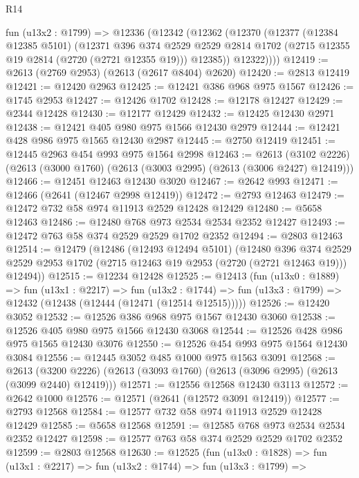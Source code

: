\begin{lexlean}{R14}
\begin{coremodule}
    fun (u13x2 : @1799) =>
    @12336
      (@12342
        (@12362
          (@12370
            (@12377
              (@12384 @12385 @5101)
              (@12371
                @396
                @374
                @2529
                @2529
                @2814
                @1702
                (@2715 @12355 @19 @2814 (@2720 (@2721 @12355 @19)))
                @12385))
            @12322))))
@12419 := @2613 (@2769 @2953) (@2613 (@2617 @8404) @2620)
@12420 := @2813 @12419
@12421 := @12420 @2963
@12425 := @12421 @386 @968 @975 @1567
@12426 := @1745 @2953
@12427 := @12426 @1702
@12428 := @12178 @12427
@12429 := @2344 @12428
@12430 := @12177 @12429
@12432 := @12425 @12430 @2971
@12438 := @12421 @405 @980 @975 @1566 @12430 @2979
@12444 := @12421 @428 @986 @975 @1565 @12430 @2987
@12445 := @2750 @12419
@12451 := @12445 @2963 @454 @993 @975 @1564 @2998
@12463 := @2613
    (@3102 @2226)
    (@2613 (@3000 @1760) (@2613 (@3003 @2995) (@2613 (@3006 @2427) @12419)))
@12466 := @12451 @12463 @12430 @3020
@12467 := @2642 @993
@12471 := @12466 (@2641 (@12467 @2998 @12419))
@12472 := @2793 @12463
@12479 := @12472 @732 @58 @974 @11913 @2529 @12428 @12429
@12480 := @5658 @12463
@12486 := @12480 @768 @973 @2534 @2534 @2352 @12427
@12493 := @12472 @763 @58 @374 @2529 @2529 @1702 @2352
@12494 := @2803 @12463
@12514 := @12479
    (@12486
      (@12493 @12494 @5101)
      (@12480
        @396
        @374
        @2529
        @2529
        @2953
        @1702
        (@2715 @12463 @19 @2953 (@2720 (@2721 @12463 @19)))
        @12494))
@12515 := @12234 @12428
@12525 := @12413
    (fun (u13x0 : @1889) =>
    fun (u13x1 : @2217) =>
    fun (u13x2 : @1744) => fun (u13x3 : @1799) => @12432 (@12438 (@12444 (@12471 (@12514 @12515)))))
@12526 := @12420 @3052
@12532 := @12526 @386 @968 @975 @1567 @12430 @3060
@12538 := @12526 @405 @980 @975 @1566 @12430 @3068
@12544 := @12526 @428 @986 @975 @1565 @12430 @3076
@12550 := @12526 @454 @993 @975 @1564 @12430 @3084
@12556 := @12445 @3052 @485 @1000 @975 @1563 @3091
@12568 := @2613
    (@3200 @2226)
    (@2613 (@3093 @1760) (@2613 (@3096 @2995) (@2613 (@3099 @2440) @12419)))
@12571 := @12556 @12568 @12430 @3113
@12572 := @2642 @1000
@12576 := @12571 (@2641 (@12572 @3091 @12419))
@12577 := @2793 @12568
@12584 := @12577 @732 @58 @974 @11913 @2529 @12428 @12429
@12585 := @5658 @12568
@12591 := @12585 @768 @973 @2534 @2534 @2352 @12427
@12598 := @12577 @763 @58 @374 @2529 @2529 @1702 @2352
@12599 := @2803 @12568
@12630 := @12525
    (fun (u13x0 : @1828) =>
    fun (u13x1 : @2217) =>
    fun (u13x2 : @1744) =>
    fun (u13x3 : @1799) =>

\end{coremodule}
\end{lexlean}
